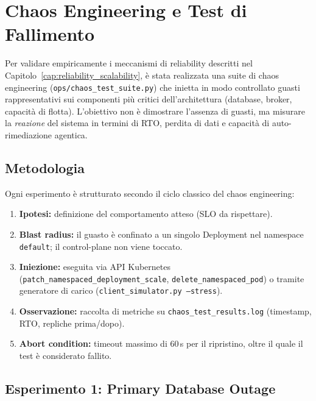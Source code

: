 
\chapter{Chaos Engineering e Test di Fallimento}
\label{cap:chaos_engineering}

Per validare empiricamente i meccanismi di reliability descritti nel Capitolo~\ref{cap:reliability_scalability}, è stata realizzata una suite di chaos engineering (\texttt{ops/chaos\_test\_suite.py}) che inietta in modo controllato guasti rappresentativi sui componenti più critici dell'architettura (database, broker, capacità di flotta). L'obiettivo non è dimostrare l'assenza di guasti, ma misurare la \emph{reazione} del sistema in termini di RTO, perdita di dati e capacità di auto-rimediazione agentica.

\section{Metodologia}
\label{sec:metodologia_chaos}

Ogni esperimento è strutturato secondo il ciclo classico del chaos engineering:

\begin{enumerate}
    \item \textbf{Ipotesi:} definizione del comportamento atteso (SLO da rispettare).
    \item \textbf{Blast radius:} il guasto è confinato a un singolo Deployment nel namespace \texttt{default}; il control-plane non viene toccato.
    \item \textbf{Iniezione:} eseguita via API Kubernetes (\texttt{patch\_namespaced\_deployment\_scale}, \texttt{delete\_namespaced\_pod}) o tramite generatore di carico (\texttt{client\_simulator.py --stress}).
    \item \textbf{Osservazione:} raccolta di metriche su \texttt{chaos\_test\_results.log} (timestamp, RTO, repliche prima/dopo).
    \item \textbf{Abort condition:} timeout massimo di 60\,s per il ripristino, oltre il quale il test è considerato fallito.
\end{enumerate}

\section{Esperimento 1: Primary Database Outage}
\label{sec:esperimento_1_influxdb}

